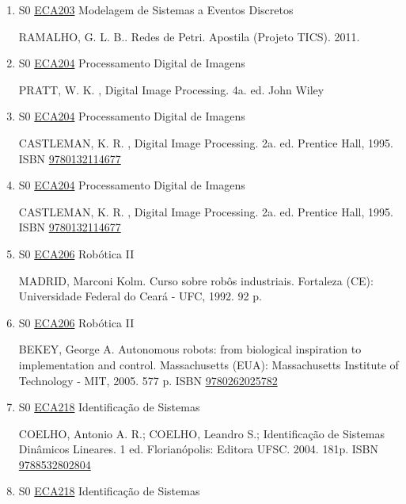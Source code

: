 \documentclass[12pt,a4paper]{book}
\begin{document}
\begin{enumerate}
 
 \item S0 \hyperref[PUD:ECA203]{ECA203} Modelagem de Sistemas a Eventos Discretos

 RAMALHO, G. L. B..  Redes de Petri.  Apostila (Projeto TICS).  2011. 
 
 
 \item S0 \hyperref[PUD:ECA204]{ECA204} Processamento Digital de Imagens

  PRATT, W. K. , Digital Image Processing.  4a. ed.  John Wiley \
 \item S0 \hyperref[PUD:ECA204]{ECA204} Processamento Digital de Imagens

  CASTLEMAN, K. R. , Digital Image Processing.  2a.  ed.  Prentice Hall, 1995.  ISBN \href{http://www.isbnsearch.org/isbn/9780132114677}{9780132114677}

 
 
 \item S0 \hyperref[PUD:ECA204]{ECA204} Processamento Digital de Imagens

  CASTLEMAN, K. R. , Digital Image Processing.  2a.  ed.  Prentice Hall, 1995.  ISBN \href{http://www.isbnsearch.org/isbn/9780132114677}{9780132114677}

 
 
 \item S0 \hyperref[PUD:ECA206]{ECA206} Robótica II

 MADRID, Marconi Kolm.  Curso sobre robôs industriais.  Fortaleza (CE): Universidade Federal do Ceará - UFC, 1992.  92 p. 
 
 
 \item S0 \hyperref[PUD:ECA206]{ECA206} Robótica II

 BEKEY, George A.  Autonomous robots: from biological inspiration to implementation and control.  Massachusetts (EUA): Massachusetts Institute of Technology - MIT, 2005.  577 p.   ISBN \href{http://www.isbnsearch.org/isbn/9780262025782}{9780262025782}
 
 
 \item S0 \hyperref[PUD:ECA218]{ECA218} Identificação de Sistemas

 COELHO, Antonio A.  R.;  COELHO, Leandro S.;  Identificação de Sistemas
Dinâmicos Lineares.  1 ed.  Florianópolis: Editora UFSC.  2004.  181p.  ISBN \href{http://www.bn.br/site/pages/servicosProfissionais/agenciaISBN/isbnBusca/FbnBuscaISBNCatalogo.asp?pField=ISBN&pIntPagina=1&pISBN=32802804&nidbISBN=true&hidbISBN=true}{9788532802804}
 
 
 \item S0 \hyperref[PUD:ECA218]{ECA218} Identificação de Sistemas


\end{enumerate}
\end{document}
